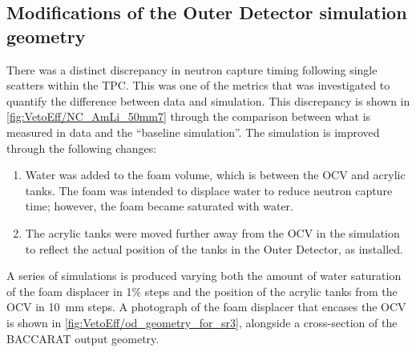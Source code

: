 \subsection{Modifications of the Outer Detector simulation geometry}\label{sec:VetoEff/GeometryEdits}
There was a distinct discrepancy in neutron capture timing following single scatters within the TPC. This was one of the metrics that was investigated to quantify the difference between data and simulation. This discrepancy is shown in \autoref{fig:VetoEff/NC_AmLi_50mm7} through the comparison between what is measured in data and the ``baseline simulation''.
The simulation is improved through the following changes:
\begin{enumerate}
	\item Water was added to the foam volume, which is between the OCV and acrylic tanks. The foam was intended to displace water to reduce neutron capture time; however, the foam became saturated with water.
    
	\item The acrylic tanks were moved further away from the OCV in the simulation to reflect the actual position of the tanks in the Outer Detector, as installed.
\end{enumerate}
A series of simulations is produced varying both the amount of water saturation of the foam displacer in 1\% steps and the position of the acrylic tanks from the OCV in 10~mm steps. A photograph of the foam displacer that encases the OCV is shown in \autoref{fig:VetoEff/od_geometry_for_sr3}, alongside a cross-section of the BACCARAT output geometry.

